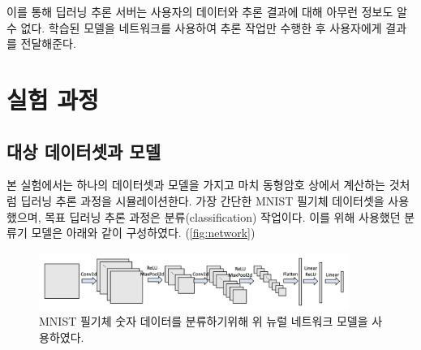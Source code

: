 \documentclass[a4paper, 11pt, chapterprefix=false]{report}
\begin{document}
이를 통해 딥러닝 추론 서버는 사용자의 데이터와 추론 결과에 대해 아무런 정보도 알
수 없다. 학습된 모델을 네트워크를 사용하여 추론 작업만 수행한 후 사용자에게
결과를 전달해준다.


\chapter{실험 과정}

\section{대상 데이터셋과 모델}

본 실험에서는 하나의 데이터셋과 모델을 가지고 마치 동형암호 상에서 계산하는
것처럼 딥러닝 추론 과정을 시뮬레이션한다. 가장 간단한 MNIST 필기체 데이터셋을
사용했으며, 목표 딥러닝 추론 과정은 분류(classification) 작업이다. 이를 위해
사용했던 분류기 모델은 아래와 같이 구성하였다. (\autoref{fig:network})
\begin{figure}[htbp]
  \centering
  \includegraphics[width=0.9\textwidth]{resource/network.png}
  \caption{MNIST 필기체 숫자 데이터를 분류하기위해 위 뉴럴 네트워크 모델을 사용하였다.}
  \label{fig:network}
\end{figure}
\end{document}
